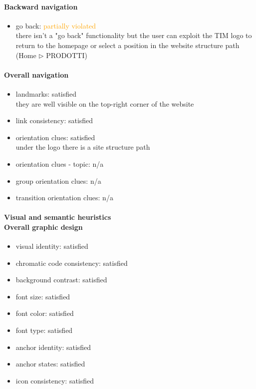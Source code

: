 \begin{enumerate}
	\paragraph*{Backward navigation}
	\begin{itemize}
		\item go back: \textcolor {orange}{partially violated}\\
		there isn't a "go back" functionality but the user can exploit the TIM logo to return to the homepage or select a position in the website structure path (Home $\triangleright$ PRODOTTI)
	\end{itemize}
	
	\paragraph*{Overall navigation}
	\begin{itemize}
		\item landmarks: satisfied\\
		they are well visible on the top-right corner of the website
		\item link consistency: satisfied
		\item orientation clues: satisfied\\
		under the logo there is a site structure path
		\item orientation clues - topic: n/a
		\item group orientation clues: n/a
		\item transition orientation clues: n/a
	\end{itemize}	
	
	\paragraph*{Visual and semantic heuristics \\ Overall graphic design }
	\begin{itemize}
		\item visual identity: satisfied
		\item chromatic code consistency: satisfied
		\item background contrast: satisfied
		\item font size: satisfied
		\item font color: satisfied
		\item font type: satisfied
		\item anchor identity: satisfied
		\item anchor states: satisfied
		\item icon consistency: satisfied
	\end{itemize}
	

\end{enumerate}
